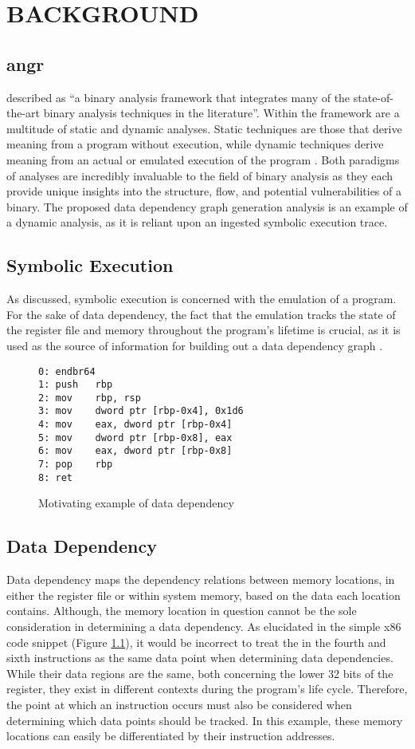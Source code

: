 \chapter{BACKGROUND}
\section{angr}
\citet{shoshitaishvili2016sok} described  as “a binary analysis framework that integrates many of the state-of-the-art binary analysis techniques in the literature”. Within the framework are a multitude of static and dynamic analyses. Static techniques are those that derive meaning from a program without execution, while dynamic techniques derive meaning from an actual or emulated execution of the program \citep{shoshitaishvili2016sok}. Both paradigms of analyses are incredibly invaluable to the field of binary analysis as they each  provide unique insights into the structure, flow, and potential vulnerabilities of a binary. The proposed data dependency graph generation analysis is an example of a dynamic analysis, as it is reliant upon an ingested symbolic execution trace.
\section{Symbolic Execution}
As \citet{shoshitaishvili2016sok} discussed, symbolic execution is concerned with the emulation of a program. For the sake of data dependency, the fact that the emulation tracks the state of the register file and memory throughout the program’s lifetime is crucial, as it is used as the source of information for building out a data dependency graph \citep{shoshitaishvili2016sok}.

\begin{figure}
\begin{lstlisting}
0: endbr64
1: push   rbp
2: mov    rbp, rsp
3: mov    dword ptr [rbp-0x4], 0x1d6
4: mov    eax, dword ptr [rbp-0x4]
5: mov    dword ptr [rbp-0x8], eax
6: mov    eax, dword ptr [rbp-0x8]
7: pop    rbp
8: ret
\end{lstlisting}
\caption{Motivating example of data dependency}
\label{fig:motiv}
\end{figure}
\section{Data Dependency}
Data dependency maps the dependency relations between memory locations, in either the register file or within system memory, based on the data each location contains. Although, the memory location in question cannot be the sole consideration in determining a data dependency. As elucidated in the simple x86 code snippet (Figure \ref{fig:motiv}), it would be incorrect to treat the  in the fourth and sixth instructions as the same data point when determining data dependencies. While their data regions are the same, both concerning the lower 32 bits of the  register, they exist in different contexts during the program’s life cycle. Therefore, the point at which an instruction occurs must also be considered when determining which data points should be tracked. In this example, these memory locations can easily be differentiated by their instruction addresses.

